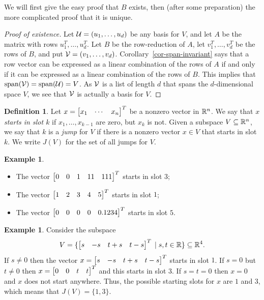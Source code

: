\documentclass[reqno]{amsart}
\theoremstyle{definition}
\newtheorem{definition}[theorem]{Definition}
\newtheorem{example}[theorem]{Example}
\begin{document}
We will first give the easy proof that $B$ exists, then (after some
preparation) the more complicated proof that it is unique.

\begin{proof}[Proof of existence]
 Let $\mathcal{U}=(u_1,\dotsc,u_d)$ be any basis for $V$, and let $A$ be the
 matrix with rows $u_1^T,\dotsc,u_d^T$.  Let $B$ be the row-reduction
 of $A$, let $v_1^T,\dotsc,v_d^T$ be the rows of $B$, and put
 $\mathcal{V}=(v_1,\dotsc,v_d)$.  Corollary~\ref{cor-span-invariant} says that
 a row vector can be expressed as a linear combination of the rows of
 $A$ if and only if it can be expressed as a linear combination of the
 rows of $B$.  This implies that $\operatorname{span}(\mathcal{V})=\operatorname{span}(\mathcal{U})=V$.  As $\mathcal{V}$ is
 a list of length $d$ that spans the $d$-dimensional space $V$, we see
 that $\mathcal{V}$ is actually a basis for $V$.
\end{proof}

\begin{definition}\label{defn-starts}
 Let $x=\left[\begin{matrix} x_1&\dotsb& x_n\end{matrix}\right]^T$ be a nonzero vector in ${\mathbb{R}}^n$.  We
 say that $x$ \emph{starts in slot $k$} if $x_1,\dotsc,x_{k-1}$ are
 zero, but $x_k$ is not.  Given a subspace $V\subseteq{\mathbb{R}}^n$, we say that
 $k$ is a \emph{jump} for $V$ if there is a nonzero vector $x\in V$
 that starts in slot $k$.  We write $J(V)$ for the set of all jumps
 for $V$.
\end{definition}

\begin{example}\label{eg-starts}\ \\
 \begin{itemize}
  \item The vector $\left[\begin{matrix} 0&0&1&11&111\end{matrix}\right]^T$ starts in slot $3$;
  \item The vector $\left[\begin{matrix} 1&2&3&4&5\end{matrix}\right]^T$ starts in slot $1$;
  \item The vector $\left[\begin{matrix} 0&0&0&0&0.1234\end{matrix}\right]^T$ starts in slot $5$.
 \end{itemize}
\end{example}

\begin{example}\label{eg-jumps-i}
 Consider the subspace
 \[ V = \{\left[\begin{matrix} s&-s&t+s&t-s\end{matrix}\right]^T\;|\; s,t\in{\mathbb{R}}\} \subseteq{\mathbb{R}}^4. \]
 If $s\neq 0$ then the vector $x=\left[\begin{matrix} s&-s&t+s&t-s\end{matrix}\right]^T$ starts in
 slot $1$.  If $s=0$ but $t\neq 0$ then $x=\left[\begin{matrix} 0&0&t&t\end{matrix}\right]^T$ and
 this starts in slot $3$.  If $s=t=0$ then $x=0$ and $x$ does not
 start anywhere.  Thus, the possible starting slots for $x$ are $1$
 and $3$, which means that $J(V)=\{1,3\}$.
\end{example}
\end{document}
